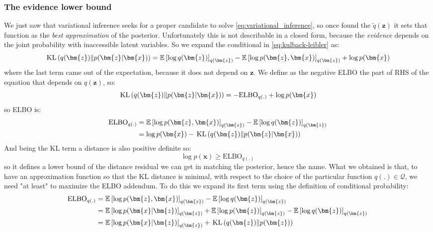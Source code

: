 \subsubsection{The evidence lower bound}
We just saw that variational inference seeks for a proper candidate to solve \eqref{eq:variational_inference}, so once found the $\tilde{q}(\bm{z})$ it sets that function as the \textit{best approximation} of the posterior. Unfortunately this is not describable in a closed form, because the \textit{evidence} depends on the joint probability with inaccessible latent variables.
So we expand the conditional in \cref{eq:kulback-leibler} as:
\begin{equation}
    \KLD{q(\bm{z})}{p(\bm{z}|\bm{x})} = \expectation{\log q(\bm{z})}_{q(\bm{z})}
                                        - \expectation{\log p(\bm{z},\bm{x})}_{q(\bm{z})} 
                                        + \log p(\bm{x})
\end{equation}
where the last term came out of the expectation, because it does not depend on $\bm{z}$. 
We define as the negative \ac{ELBO} the part of RHS of the equation that depends on $q(\bm{z})$, so:
\begin{equation}
    \KLD{q(\bm{z})}{p(\bm{z}|\bm{x})} = - \mathrm{ELBO}_{q(.)} + \log p(\bm{x})
\end{equation}
so \acs{ELBO} is:
\begin{align*}
    \mathrm{ELBO}_{q(.)} &= \expectation{\log p(\bm{z},\bm{x})}_{q(\bm{z})} - \expectation{\log q(\bm{z})}_{q(\bm{z})} \\
                         &= \log p(\bm{x}) - \KLD{q(\bm{z})}{p(\bm{z}|\bm{x})} 
\end{align*}
And being the KL term a distance is also positive definite so:
\begin{equation}
    \log p(\bm{x}) \geqslant \mathrm{ELBO}_{q(.)}
\end{equation}
so it defines a lower bound of the distance residual we can get in matching the posterior, hence the name. What we obtained is that, to have an approximation function so that the KL distance is minimal, with respect to the choice of the particular function $q(.) \in \mathcal{Q}$, we need "at least" to maximize the \acs{ELBO} addendum.
To do this we expand its first term using the definition of conditional probability:
\begin{align*}
    \mathrm{ELBO}_{q(.)} &= \expectation{\log p(\bm{z},\bm{x})}_{q(\bm{z})} - \expectation{\log q(\bm{z})}_{q(\bm{z})} \\
                         &= \expectation{\log p(\bm{x}|\bm{z})}_{q(\bm{z})} + \expectation{\log p(\bm{z})}_{q(\bm{z})} - \expectation{\log q(\bm{z})}_{q(\bm{z})} \\
                         &= \expectation{\log p(\bm{x}|\bm{z})}_{q(\bm{z})} + \KLD{q(\bm{z})}{p(\bm{z})}
\end{align*}


